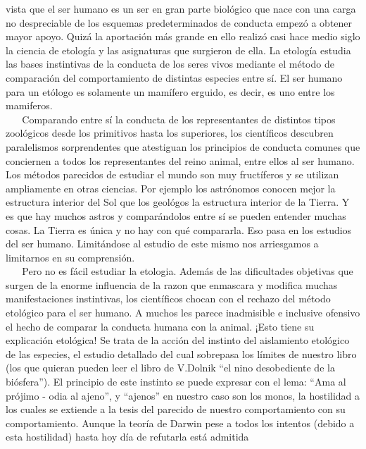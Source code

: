 vista que el ser humano es un ser en gran parte biológico que nace con
una carga no despreciable de los esquemas predeterminados de conducta
empezó a obtener mayor apoyo. Quizá la aportación más grande en ello
realizó casi hace medio siglo la ciencia de etología y las asignaturas
que surgieron de ella. La etología estudia las bases instintivas de la
conducta de los seres vivos mediante el método de comparación del
comportamiento de distintas especies entre sí. El ser humano para un
etólogo es solamente un mamífero erguido, es decir, es uno entre los
mamiferos.\\
\hspace*{0.333em} ~ ~ Comparando entre sí la conducta de los
representantes de distintos tipos zoológicos desde los primitivos hasta
los superiores, los científicos descubren paralelismos sorprendentes que
atestiguan los principios de conducta comunes que conciernen a todos los
representantes del reino animal, entre ellos al ser humano. Los métodos
parecidos de estudiar el mundo son muy fructíferos y se utilizan
ampliamente en otras ciencias. Por ejemplo los astrónomos conocen mejor
la estructura interior del Sol que los geológos la estructura interior
de la Tierra. Y es que hay muchos astros y comparándolos entre sí se
pueden entender muchas cosas. La Tierra es única y no hay con qué
compararla. Eso pasa en los estudios del ser humano. Limitándose al
estudio de este mismo nos arriesgamos a limitarnos en su comprensión.\\
\hspace*{0.333em} ~ ~ Pero no es fácil estudiar la etologia. Además de
las dificultades objetivas que surgen de la enorme influencia de la
razon que enmascara y modifica muchas manifestaciones instintivas, los
científicos chocan con el rechazo del método etológico para el ser
humano. A muchos les parece inadmisible e inclusive ofensivo el hecho de
comparar la conducta humana con la animal. ¡Esto tiene su explicación
etológica! Se trata de la acción del instinto del aislamiento etológico
de las especies, el estudio detallado del cual sobrepasa los límites de
nuestro libro (los que quieran pueden leer el libro de V.Dolnik ``el
nino desobediente de la biósfera''). El principio de este instinto se
puede expresar con el lema: ``Ama al prójimo - odia al ajeno'', y
``ajenos'' en nuestro caso son los monos, la hostilidad a los cuales se
extiende a la tesis del parecido de nuestro comportamiento con su
comportamiento. Aunque la teoría de Darwin pese a todos los intentos
(debido a esta hostilidad) hasta hoy día de refutarla está admitida
